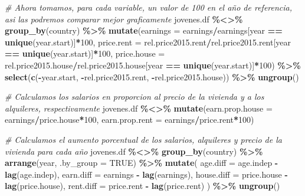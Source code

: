 \documentclass[water,article,submit,pdftex,moreauthors]{Definitions/mdpi}
\newenvironment{Shaded}{\begin{snugshade}}{\end{snugshade}}
\newcommand{\AttributeTok}[1]{\textcolor[rgb]{0.13,0.29,0.53}{#1}}
\newcommand{\CommentTok}[1]{\textcolor[rgb]{0.56,0.35,0.01}{\textit{#1}}}
\newcommand{\ConstantTok}[1]{\textcolor[rgb]{0.56,0.35,0.01}{#1}}
\newcommand{\DecValTok}[1]{\textcolor[rgb]{0.00,0.00,0.81}{#1}}
\newcommand{\FunctionTok}[1]{\textcolor[rgb]{0.13,0.29,0.53}{\textbf{#1}}}
\newcommand{\NormalTok}[1]{#1}
\newcommand{\SpecialCharTok}[1]{\textcolor[rgb]{0.81,0.36,0.00}{\textbf{#1}}}
\begin{document}
\begin{Shaded}
\begin{Highlighting}[]
\CommentTok{\# Ahora tomamos, para cada variable, un valor de 100 en el año de referencia, asi las podremos comparar mejor graficamente}
\NormalTok{jovenes.df }\SpecialCharTok{\%\textless{}\textgreater{}\%} \FunctionTok{group\_by}\NormalTok{(country) }\SpecialCharTok{\%\textgreater{}\%} \FunctionTok{mutate}\NormalTok{(}\AttributeTok{earnings =}\NormalTok{ earnings}\SpecialCharTok{/}\NormalTok{earnings[year }\SpecialCharTok{==} \FunctionTok{unique}\NormalTok{(year.start)]}\SpecialCharTok{*}\DecValTok{100}\NormalTok{, }\AttributeTok{price.rent =}\NormalTok{ rel.price2015.rent}\SpecialCharTok{/}\NormalTok{rel.price2015.rent[year }\SpecialCharTok{==} \FunctionTok{unique}\NormalTok{(year.start)]}\SpecialCharTok{*}\DecValTok{100}\NormalTok{, }\AttributeTok{price.house =}\NormalTok{ rel.price2015.house}\SpecialCharTok{/}\NormalTok{rel.price2015.house[year }\SpecialCharTok{==} \FunctionTok{unique}\NormalTok{(year.start)]}\SpecialCharTok{*}\DecValTok{100}\NormalTok{) }\SpecialCharTok{\%\textgreater{}\%} \FunctionTok{select}\NormalTok{(}\FunctionTok{c}\NormalTok{(}\SpecialCharTok{{-}}\NormalTok{year.start, }\SpecialCharTok{{-}}\NormalTok{rel.price2015.rent, }\SpecialCharTok{{-}}\NormalTok{rel.price2015.house)) }\SpecialCharTok{\%\textgreater{}\%} \FunctionTok{ungroup}\NormalTok{()}

\CommentTok{\# Calculamos los salarios en proporcion al precio de la vivienda y a los alquileres, respectivamente}
\NormalTok{jovenes.df }\SpecialCharTok{\%\textless{}\textgreater{}\%} \FunctionTok{mutate}\NormalTok{(}\AttributeTok{earn.prop.house =}\NormalTok{ earnings}\SpecialCharTok{/}\NormalTok{price.house}\SpecialCharTok{*}\DecValTok{100}\NormalTok{, }\AttributeTok{earn.prop.rent =}\NormalTok{ earnings}\SpecialCharTok{/}\NormalTok{price.rent}\SpecialCharTok{*}\DecValTok{100}\NormalTok{)}

\CommentTok{\# Calculamos el aumento porcentual de los salarios, alquileres y precio de la vivienda para cada año}
\NormalTok{jovenes.df }\SpecialCharTok{\%\textless{}\textgreater{}\%}
  \FunctionTok{group\_by}\NormalTok{(country) }\SpecialCharTok{\%\textgreater{}\%}
  \FunctionTok{arrange}\NormalTok{(year, }\AttributeTok{.by\_group =} \ConstantTok{TRUE}\NormalTok{) }\SpecialCharTok{\%\textgreater{}\%}
  \FunctionTok{mutate}\NormalTok{(}
    \AttributeTok{age.diff =}\NormalTok{ age.indep }\SpecialCharTok{{-}} \FunctionTok{lag}\NormalTok{(age.indep),}
    \AttributeTok{earn.diff =}\NormalTok{ earnings }\SpecialCharTok{{-}} \FunctionTok{lag}\NormalTok{(earnings),}
    \AttributeTok{house.diff =}\NormalTok{ price.house }\SpecialCharTok{{-}} \FunctionTok{lag}\NormalTok{(price.house),}
    \AttributeTok{rent.diff =}\NormalTok{ price.rent }\SpecialCharTok{{-}} \FunctionTok{lag}\NormalTok{(price.rent)}
\NormalTok{  ) }\SpecialCharTok{\%\textgreater{}\%}
  \FunctionTok{ungroup}\NormalTok{()}
\end{Highlighting}
\end{Shaded}
\end{document}
